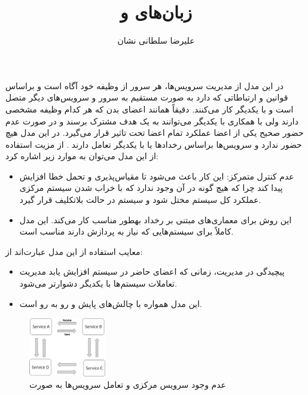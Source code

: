 \documentclass[a4paper]{article}
\title{زبان‌های \lr{Orchestration} و \lr{Choreography}}
\author{علیرضا سلطانی نشان}
\begin{document}
\maketitle

\section{}

در این مدل از مدیریت سرویس‌ها، هر سرور از وظیفه خود آگاه است و براساس قوانین و
ارتباطاتی که دارد به صورت مستقیم به سرور و سرویس‌های دیگر متصل است و با یکدیگر
کار می‌کنند. دقیقاً همانند اعضای بدن که هر کدام وظیفه مشخصی دارند ولی با همکاری
با یکدیگر می‌توانند به یک هدف مشترک برسند و در صورت عدم حضور صحیح یکی از اعضا
عملکرد تمام اعضا تحت تاثیر قرار می‌گیرد. در این مدل هیچ 
حضور ندارد و سرویس‌ها براساس رخداد‌ها یا  با یکدیگر تعامل دارند
\cite{cvom}. از مزیت استفاده از این مدل می‌توان به موارد زیر اشاره کرد:

\begin{itemize}
    \item عدم کنترل متمرکز: این کار باعث می‌شود تا مقیاس‌پذیری و تحمل خطا افزایش
    پیدا‌ کند چرا که هیچ گونه  در آن وجود ندارد که
    با خراب شدن سیستم مرکزی عملکرد کل سیستم مختل شود و سیستم در حالت بلاتکلیف
    قرار گیرد.
    \item این روش برای معماری‌های مبتنی بر رخداد بهطور مناسب کار می‌کند. این مدل
    کاملاً برای سیستم‌هایی که نیاز به پردازش  دارند مناسب است.
\end{itemize}

معایب استفاده از این مدل عبارت‌اند از:

\begin{itemize}
    \item پیچیدگی در مدیریت، زمانی که اعضای حاضر در سیستم افزایش یابد مدیریت
    تعاملات سیستم‌ها با یکدیگر دشوارتر می‌شود.
    \item این مدل همواره با چالش‌های پایش و  رو به رو است.
\end{itemize}

\begin{figure}[H]
    \centering
    \includegraphics[width=0.3\textwidth]{choreography.jpeg}
    \caption{عدم وجود سرویس مرکزی و تعامل سرویس‌ها به صورت 
    \cite{stackoverflow}}
    \label{fig:atmDiagram}
\end{figure}
\end{document}

